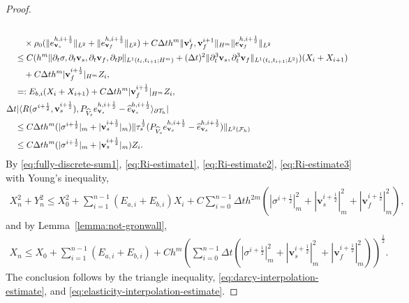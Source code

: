 \documentclass[10pt,letterpaper]{amsart}
\theoremstyle{plain} %
\theoremstyle{remark} %
\newcommand{\vect}[1]{\mathbf{#1}}
\newcommand{\pThprod}[2]{\langle #1, #2 \rangle_{\partial \mathcal{T}_{h}}}
\begin{document}
\begin{proof}
\begin{align}
    \\
    \notag
    &\qquad \times \rho_0 (\| e_{\vect{v}_s}^{h,i+\frac 12}\|_{L^2} + \| e_{\vect{v}_f}^{h,i+\frac 12} \|_{L^2}) + C \Delta t h^m \| \vect{v}_f^i, \vect{v}_f^{i+1} \|_{H^m} \| e_{\vect{v}_f}^{h,i+\frac 12} \|_{L^2} 
	\\
	\notag
	&\quad \le C( h^m \| {\partial_t \sigma, \partial_t \vect{v}_s, \partial_t \vect{v}_f, \partial_t p} \|_{L^1(t_i, t_{i+1}; H^m)} + (\Delta t)^2 \| \partial_t^3 \vect{v}_s, \partial_t^3 \vect{v}_f \|_{L^1(t_i, t_{i+1}; L^2)}) (X_i + X_{i+1}) 
	\\
	\notag
	&\qquad + C \Delta t h^m | \vect{v}_f^{i+\frac 12} |_{H^m} Z_i ,
	\\
	& \notag 
	\quad =: E_{b,i} (X_i + X_{i+1}) + C \Delta t h^m | \vect{v}_f^{i+\frac 12} |_{H^m} Z_i ,
	\\
	\label{eq:Ri-estimate3}
	&\Delta t |\pThprod{R(\sigma^{i+\frac 12}, \vect{v}_s^{i+\frac 12})}{{P_{\widehat{V}_s}} e_{\vect{v}_{s}}^{h,i+\frac 12} - \widehat{e}_{\vect{v}_{s}}^{h,i+\frac 12}}| 
	\\
	\notag
	&\quad \le C\Delta t h^m (|\sigma^{i+\frac 12}|_{m} + |\vect{v}_s^{i+\frac 12}|_{m}) \|\tau_s^{\frac 12} (P_{\widehat{V}_s} e_{\vect{v}_{s}}^{h,i+\frac 12} - \widehat{e}_{\vect{v}_{s}}^{h,i+\frac 12})\|_{L^2(\mathcal{F}_h)}
	\\
	\notag
	&\quad \le C\Delta t h^m (|\sigma^{i+\frac 12}|_{m} + |\vect{v}_s^{i+\frac 12}|_{m}) Z_i .
\end{align}
%
By \eqref{eq:fully-discrete-sum1}, \eqref{eq:Ri-estimate1}, \eqref{eq:Ri-estimate2}, \eqref{eq:Ri-estimate3} with Young's inequality, 
%
\begin{align*}
	X_n^2 + Y_n^2 \le X_0^2 + \sum_{i=1}^{n-1} (E_{a,i}+E_{b,i}) X_i + C \sum_{i=0}^{n-1} \Delta t h^{2m} (|\sigma^{i+\frac 12}|_m^2 + |\vect{v}_s^{i+\frac 12}|_m^2 + |\vect{v}_f^{i+\frac 12}|_m^2), 
\end{align*}
%
and by Lemma~\ref{lemma:not-gronwall}, 
%
\begin{align*}
	X_n \le X_0 + \sum_{i=1}^{n-1} (E_{a,i}+E_{b,i}) + Ch^m \left( \sum_{i=0}^{n-1} \Delta t (|\sigma^{i+\frac 12}|_m^2 + |\vect{v}_s^{i+\frac 12}|_m^2 + |\vect{v}_f^{i+\frac 12}|_m^2) \right)^{\frac 12} .
\end{align*}
%
The conclusion follows by the triangle inequality, \eqref{eq:darcy-interpolation-estimate}, and \eqref{eq:elasticity-interpolation-estimate}.
\end{proof}
\end{document}

